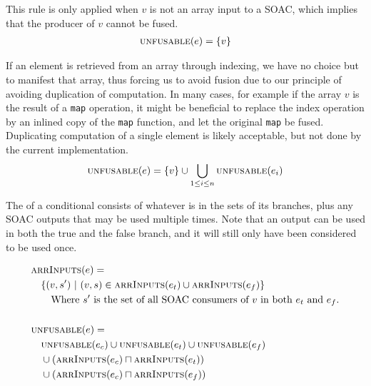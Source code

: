 \begin{description}[style=nextline]
\item[Case $e \equiv v$]

  This rule is only applied when $v$ is not an array input to a SOAC,
  which implies that the producer of $v$ cannot be fused.
\begin{align*}
  & \textsc{unfusable}(e) = \{v\} \\
\end{align*}

\item[Case $e \equiv \texttt{$v$[$e_{1}$, \ldots, $e_{n}$]}$]

  If an element is retrieved from an array through indexing, we have
  no choice but to manifest that array, thus forcing us to avoid
  fusion due to our principle of avoiding duplication of computation.
  In many cases, for example if the array $v$ is the result of a
  \texttt{map} operation, it might be beneficial to replace the index
  operation by an inlined copy of the \texttt{map} function, and let
  the original \texttt{map} be fused.  Duplicating computation of a
  single element is likely acceptable, but not done by the current
  implementation.
  \begin{align*}
  & \textsc{unfusable}(e) = \{v\} \cup \bigcup_{1\leq i \leq n}\textsc{unfusable}(e_{i}) \\
\end{align*}

\item[Case $e \equiv \texttt{if $e_{c}$ then $e_{t}$ else $e_{f}$}$]

  The \unfusable{} of a conditional consists of whatever is in the
  \unfusable{} sets of its branches, plus any SOAC outputs that may be
  used multiple times.  Note that an output can be used in both the
  true and the false branch, and it will still only have been
  considered to be used once.

\begin{align*}
  & \textsc{arrInputs}(e) =\\
  & \quad \{ (v,s')\ |\ (v,s) \in \textsc{arrInputs}(e_{t}) \cup \textsc{arrInputs}(e_{f}) \}\\
  & \quad\quad \text{Where $s'$ is the set of all SOAC consumers of $v$ in both $e_{t}$ and $e_{f}$.} \\
  \\
  & \textsc{unfusable}(e) =\\
  & \quad \textsc{unfusable}(e_{c}) \cup \textsc{unfusable}(e_{t}) \cup \textsc{unfusable}(e_{f})\\
  & \quad \cup (\textsc{arrInputs}(e_{c}) \sqcap \textsc{arrInputs}(e_{t}))\\
  & \quad \cup (\textsc{arrInputs}(e_{c}) \sqcap \textsc{arrInputs}(e_{f}))\\
\end{align*}


\end{description}
